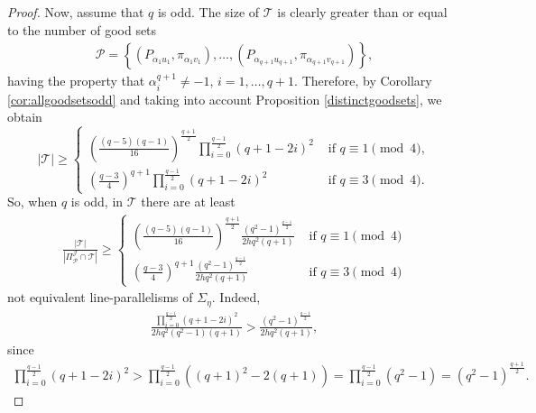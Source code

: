 \documentclass[10pt,a4paper]{amsart}
\def\cJ{\mathcal J}
\def\cP{\mathcal P}
\def\cT{\mathcal T}
\begin{document}
\begin{proof}
Now, assume that $q$ is odd. The size of $\cT$ is clearly greater than or equal to the number of good sets
\begin{align*}
\cP = \left\{\left(P_{\alpha_{1} u_1}, \pi_{\alpha_{1} v_1}\right), \dots, \left(P_{\alpha_{q+1} u_{q+1}}, \pi_{\alpha_{q+1} v_{q+1}}\right)\right\},
\end{align*}
having the property that $\alpha_i^{q+1} \neq -1$, $i = 1, \dots, q+1$. Therefore, by Corollary \ref{cor:allgoodsetsodd} and taking into account Proposition \ref{distinctgoodsets}, we obtain
\[
|\cT| \geq 
    \begin{cases} 
    \left(\frac{(q-5)(q-1)}{16}\right)^{\frac{q+1}{2}} \prod\limits_{i=0}^{\frac{q-1}{2}} \left(q+1-2i \right)^2 & \mbox{ if }q \equiv 1 \pmod{4}, \\ 
    \left(\frac{q-3}{4}\right)^{q+1} \prod\limits_{i=0}^{\frac{q-1}{2}} \left(q+1-2i \right)^2 & \mbox{ if } q \equiv 3 \pmod{4}. 
    \end{cases}
\]
So, when $q$ is odd, in $\cT$ there are at least 
\begin{align*}
    \frac{|\cT|}{|\Pi_{\cP}^{\cJ} \cap \cT|} \ge 
   \begin{cases} 
   \left(\frac{(q-5)(q-1)}{16}\right)^{\frac{q+1}{2}} \frac{(q^2-1)^{\frac{q-1}{2}}}{2hq^2(q+1)} & \mbox{ if }q \equiv 1 \pmod{4} \\ 
   \left(\frac{q-3}{4}\right)^{q+1} \frac{(q^2-1)^{\frac{q-1}{2}}}{2hq^2(q+1)} & \mbox{ if } q \equiv 3 \pmod{4}
   \end{cases}
\end{align*}
not equivalent line-parallelisms of $\Sigma_{\eta}$. Indeed,
\begin{align*}
    \frac{\prod_{i = 0}^{\frac{q-1}{2}} \left(q+1 - 2 i \right)^2}{2hq^2(q^2-1)(q+1)} > \frac{(q^2-1)^{\frac{q-1}{2}}}{2hq^2(q+1)},
\end{align*}
since
\begin{align*}
    \prod_{i = 0}^{\frac{q-1}{2}} \left(q+1 - 2i \right)^2 > \prod_{i = 0}^{\frac{q-1}{2}} \left((q+1)^2 - 2 (q+1) \right) = \prod_{i = 0}^{\frac{q-1}{2}} \left(q^2-1 \right) = \left(q^2-1\right)^\frac{q+1}{2}.
\end{align*}
\end{proof}
\end{document}
